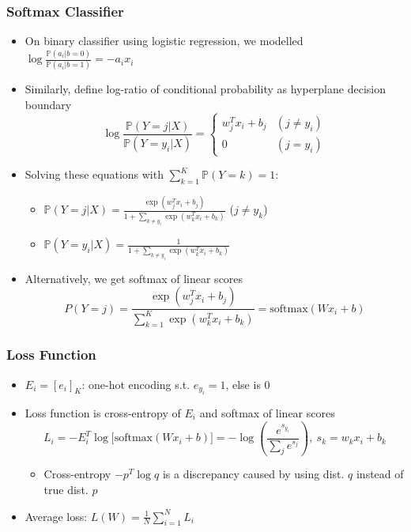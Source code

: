 \subsubsection*{Softmax Classifier}
\begin{itemize}
    \item On binary classifier using logistic regression, we modelled $\log\frac{\mathbb{P}(a_i|b=0)}{\mathbb{P}(a_i|b=1)}=-a_ix_i$
    \item Similarly, define log-ratio of conditional probability as hyperplane decision boundary
    \begin{equation}
        \log\frac{\mathbb{P}(Y=j|X)}{\mathbb{P}(Y=y_i|X)}=\begin{cases}
            w_j^Tx_i+b_j & (j\neq y_i)\\
            0 & (j=y_i)
        \end{cases}
    \end{equation}
    \item Solving these equations with $\sum_{k=1}^K\mathbb{P}(Y=k)=1$:
    \begin{itemize}
        \item $\mathbb{P}(Y=j|X)=\frac{\exp(w_j^Tx_i+b_j)}{1+\sum_{k\neq y_i}\exp(w_k^Tx_i+b_k)}$ ($j\neq y_k$)
        \item $\mathbb{P}(Y=y_i|X)=\frac{1}{1+\sum_{k\neq y_i}\exp(w_k^Tx_i+b_k)}$
    \end{itemize}
    \item Alternatively, we get softmax of linear scores
    \begin{equation}
        P(Y=j)=\frac{\exp(w_j^Tx_i+b_j)}{\sum_{k=1}^K\exp(w_k^Tx_i+b_k)}=\text{softmax}(Wx_i+b)
    \end{equation}
\end{itemize}

\subsubsection*{Loss Function}
\begin{itemize}
    \item $E_i=[e_i]_K$: one-hot encoding s.t. $e_{y_i}=1$, else is $0$
    \item Loss function is cross-entropy of $E_i$ and softmax of linear scores
    \begin{equation}
        L_i=-E_i^T\log\Bigr[\text{softmax}(Wx_i+b)\Bigr]=-\log\left(\frac{e^{s_{y_i}}}{\sum_j e^{s_j}}\right),~s_k=w_kx_i+b_k
    \end{equation}
    \begin{itemize}
        \item Cross-entropy $-p^T\log q$ is a discrepancy caused by using dist. $q$ instead of true dist. $p$
    \end{itemize}
    \item Average loss: $L(W)=\frac{1}{N}\sum_{i=1}^NL_i$
\end{itemize}
